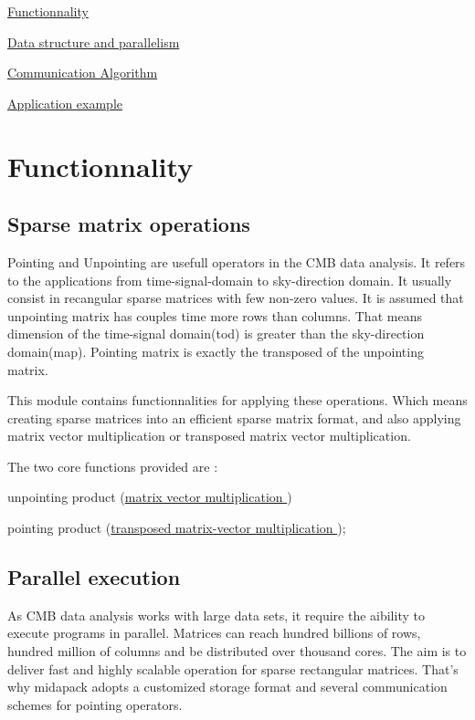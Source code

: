 
\begin{DoxyItemize}
\item \hyperlink{functionnality}{Functionnality}
\item \hyperlink{data_struct_parall}{Data structure and parallelism}
\item \hyperlink{algorithm}{Communication Algorithm}
\item \hyperlink{example}{Application example} 
\end{DoxyItemize}\hypertarget{functionnality}{}\section{Functionnality}\label{functionnality}
\hypertarget{functionnality_operations}{}\subsection{Sparse matrix operations}\label{functionnality_operations}
Pointing and Unpointing are usefull operators in the C\-M\-B data analysis. It refers to the applications from time-\/signal-\/domain to sky-\/direction domain. It usually consist in recangular sparse matrices with few non-\/zero values. It is assumed that unpointing matrix has couples time more rows than columns. That means dimension of the time-\/signal domain(tod) is greater than the sky-\/direction domain(map). Pointing matrix is exactly the transposed of the unpointing matrix.

This module contains functionnalities for applying these operations. Which means creating sparse matrices into an efficient sparse matrix format, and also applying matrix vector multiplication or transposed matrix vector multiplication.

The two core functions provided are \-: \begin{DoxyItemize}
\item unpointing product (\hyperlink{group__matmap__group12a_gaf757d9249d31d2839b3376ac2e3f5574}{matrix vector multiplication }) \item pointing product (\hyperlink{group__matmap__group11_ga1a51d7e8153d33045482100bbd07d0a9}{transposed matrix-\/vector multiplication });\end{DoxyItemize}
\hypertarget{functionnality_execution}{}\subsection{Parallel execution}\label{functionnality_execution}
As C\-M\-B data analysis works with large data sets, it require the aibility to execute programs in parallel. Matrices can reach hundred billions of rows, hundred million of columns and be distributed over thousand cores. The aim is to deliver fast and highly scalable operation for sparse rectangular matrices. That's why midapack adopts a customized storage format and several communication schemes for pointing operators.

